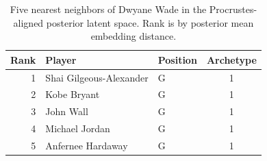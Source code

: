 \begin{table}[htbp]
  \centering\small
  \begin{tabular}{rllc}
    \toprule
    Rank & Player & Position & Archetype \\
    \midrule
    1 & Shai Gilgeous-Alexander & G & 1 \\
    2 & Kobe Bryant & G & 1 \\
    3 & John Wall & G & 1 \\
    4 & Michael Jordan & G & 1 \\
    5 & Anfernee Hardaway & G & 1 \\
    \bottomrule
  \end{tabular}
  \caption{Five nearest neighbors of Dwyane Wade in the Procrustes-aligned posterior latent space. Rank is by posterior mean embedding distance.}
  \label{tab:Dwyane_Wade_neighbors}
\end{table}

